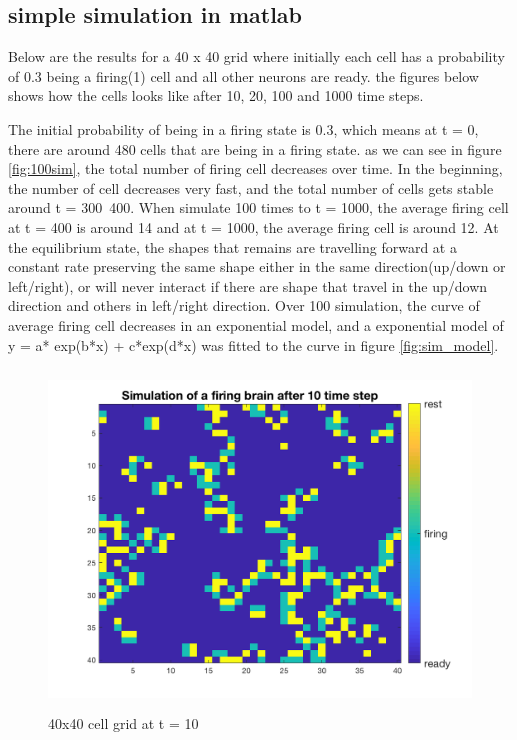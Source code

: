\documentclass[12pt]{article}
\begin{document}
\subsection{simple simulation in matlab}

Below are the results for a 40 x 40 grid where initially each cell has a probability of 0.3 being a firing(1) cell and all other neurons are ready. the figures below shows how the cells looks like after 10, 20, 100 and 1000 time steps. 

The initial probability of being in a firing state is 0.3, which means at t = 0, there are around 480 cells that are being in a firing state. as we can see in figure \ref{fig:100sim}, the total number of firing cell decreases over time. In the beginning, the number of cell decreases very fast, and the total number of cells gets stable around t = 300~400. When simulate 100 times to t = 1000, the average firing cell at t = 400 is around 14 and at t = 1000, the average firing cell is around 12. At the equilibrium state, the shapes that remains are travelling forward at a constant rate preserving the same shape either in the same direction(up/down or left/right), or will never interact if there are shape that travel in the up/down direction and others in left/right direction. Over 100 simulation, the curve of average firing cell decreases in an exponential model, and a exponential model of y = a* exp(b*x) + c*exp(d*x) was fitted to the curve in figure \ref{fig:sim_model}.


\begin{figure}[H] %
\centering
\includegraphics[width = 12 cm, height = 9cm]{fire10.png}
\caption{40x40 cell grid at t = 10}
\label{fig:fire10}
\end{figure}
\end{document}
